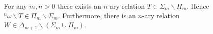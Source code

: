 For any $m, n > 0$ there exists an $n$-ary relation $T \in \Sigma_m \smallsetminus \Pi_m$. Hence ${}^n\omega \smallsetminus T \in \Pi_m \smallsetminus \Sigma_m$. Furthermore, there is an $n$-ary relation $W \in \Delta_{m+1} \smallsetminus (\Sigma_m \cup \Pi_m)$.
